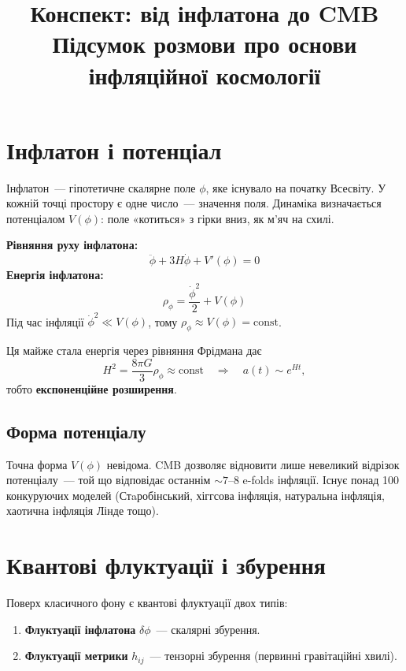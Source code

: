 \documentclass[12pt, a4paper]{article}
\title{\textbf{Конспект: від інфлатона до CMB}\\
       \large Підсумок розмови про основи інфляційної космології}
\author{}
\date{}
\begin{document}
\maketitle
\tableofcontents
\newpage

\section{Інфлатон і потенціал}

Інфлатон~--- гіпотетичне скалярне поле $\phi$, яке існувало на початку Всесвіту.
У кожній точці простору є одне число~--- значення поля.
Динаміка визначається потенціалом $V(\phi)$: поле «котиться» з гірки вниз,
як м'яч на схилі.

\begin{keybox}
\textbf{Рівняння руху інфлатона:}
\[
  \ddot{\phi} + 3H\dot{\phi} + V'(\phi) = 0
\]
\textbf{Енергія інфлатона:}
\[
  \rho_\phi = \frac{\dot{\phi}^2}{2} + V(\phi)
\]
Під час інфляції $\dot{\phi}^2 \ll V(\phi)$, тому $\rho_\phi \approx V(\phi) = \text{const}$.
\end{keybox}

Ця майже стала енергія через рівняння Фрідмана дає
\[
  H^2 = \frac{8\pi G}{3}\rho_\phi \approx \text{const}
  \quad\Rightarrow\quad
  a(t) \sim e^{Ht},
\]
тобто \textbf{експоненційне розширення}.

\subsection{Форма потенціалу}

Точна форма $V(\phi)$ невідома. CMB дозволяє відновити лише невеликий відрізок
потенціалу~--- той що відповідає останнім $\sim\!7$--$8$ e-folds інфляції.
Існує понад 100 конкуруючих моделей (Стaробінський, хіггсова інфляція,
натуральна інфляція, хаотична інфляція Лінде тощо).

\section{Квантові флуктуації і збурення}

Поверх класичного фону є квантові флуктуації двох типів:

\begin{enumerate}
  \item \textbf{Флуктуації інфлатона} $\delta\phi$~--- скалярні збурення.
  \item \textbf{Флуктуації метрики} $h_{ij}$~--- тензорні збурення (первинні гравітаційні хвилі).
\end{enumerate}
\end{document}
